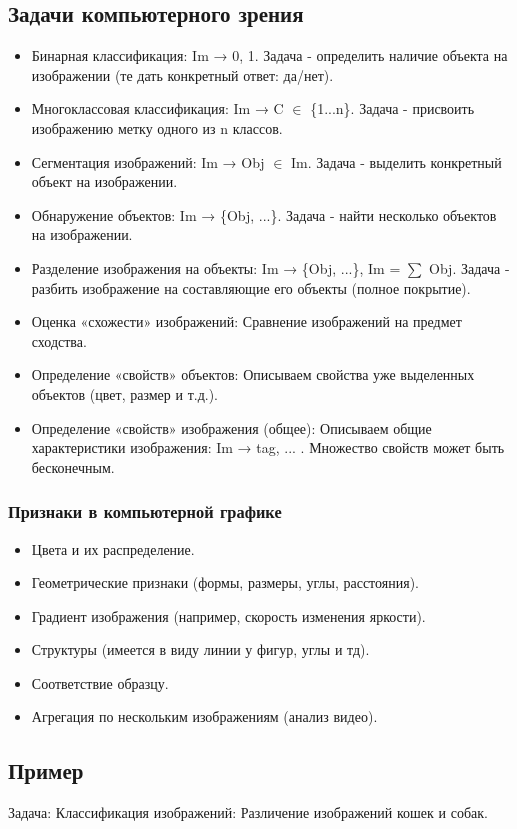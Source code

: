 
\subsection{Задачи компьютерного зрения}
\begin{itemize}
    \item Бинарная классификация: Im → 0, 1. Задача - определить наличие объекта на изображении (те дать конкретный ответ: да/нет).
    \item Многоклассовая классификация: Im → C \(\in\) \{1...n\}. Задача - присвоить изображению метку одного из n классов.
    \item Сегментация изображений: Im → Obj \(\in\) Im. Задача - выделить конкретный объект на изображении.
    \item Обнаружение объектов: Im → \{Obj, ...\}. Задача - найти несколько объектов на изображении.
    \item Разделение изображения на объекты: Im → \{Obj, ...\}, Im = \(\sum\) Obj. Задача - разбить изображение на составляющие его объекты (полное покрытие).
    \item Оценка «схожести» изображений: Сравнение изображений на предмет сходства.
    \item Определение «свойств» объектов: Описываем свойства уже выделенных объектов (цвет, размер и т.д.).
    \item Определение «свойств» изображения (общее): Описываем общие характеристики изображения: Im → tag, ... . Множество свойств может быть бесконечным.
\end{itemize}
\subsubsection{Признаки в компьютерной графике}
\begin{itemize}
    \item Цвета и их распределение.
    \item Геометрические признаки (формы, размеры, углы, расстояния).
    \item Градиент изображения (например, скорость изменения яркости).
    \item Структуры (имеется в виду линии у фигур, углы и тд).
    \item Соответствие образцу.
    \item Агрегация по нескольким изображениям (анализ видео).
\end{itemize}
\newpage
\subsection*{Пример}
Задача: Классификация изображений: Различение изображений кошек и
собак.

